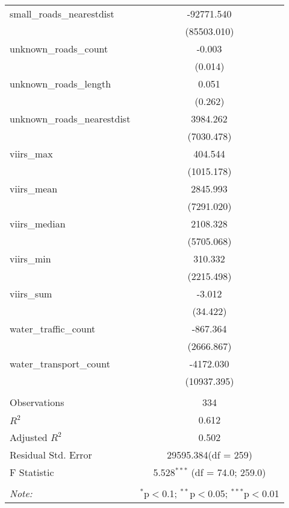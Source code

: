 \begin{table}[!htbp]
\begin{tabular}{@{\extracolsep{5pt}}lc}
 small_roads_nearestdist & -92771.540$^{}$ \\
  & (85503.010) \\
 unknown_roads_count & -0.003$^{}$ \\
  & (0.014) \\
 unknown_roads_length & 0.051$^{}$ \\
  & (0.262) \\
 unknown_roads_nearestdist & 3984.262$^{}$ \\
  & (7030.478) \\
 viirs_max & 404.544$^{}$ \\
  & (1015.178) \\
 viirs_mean & 2845.993$^{}$ \\
  & (7291.020) \\
 viirs_median & 2108.328$^{}$ \\
  & (5705.068) \\
 viirs_min & 310.332$^{}$ \\
  & (2215.498) \\
 viirs_sum & -3.012$^{}$ \\
  & (34.422) \\
 water_traffic_count & -867.364$^{}$ \\
  & (2666.867) \\
 water_transport_count & -4172.030$^{}$ \\
  & (10937.395) \\
\hline \\[-1.8ex]
 Observations & 334 \\
 $R^2$ & 0.612 \\
 Adjusted $R^2$ & 0.502 \\
 Residual Std. Error & 29595.384(df = 259)  \\
 F Statistic & 5.528$^{***}$ (df = 74.0; 259.0) \\
\hline
\hline \\[-1.8ex]
\textit{Note:} & \multicolumn{1}{r}{$^{*}$p$<$0.1; $^{**}$p$<$0.05; $^{***}$p$<$0.01} \\
\end{tabular}
\end{table}